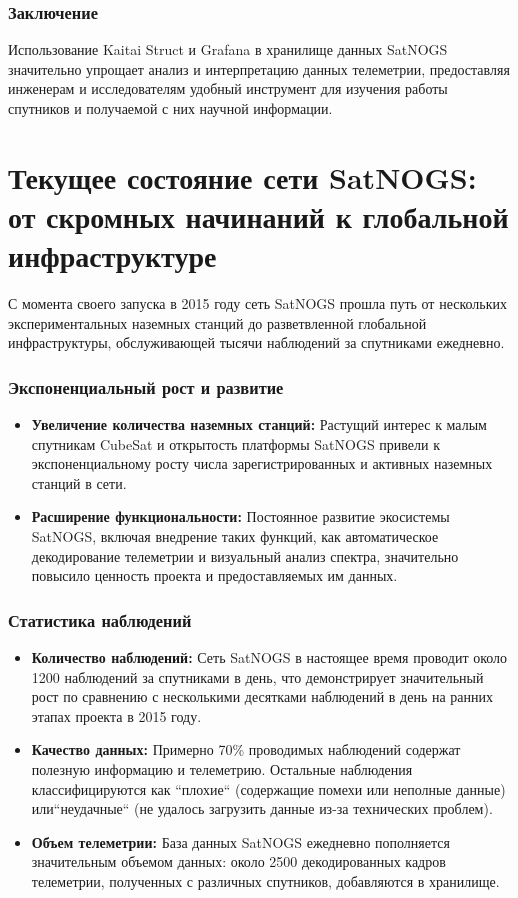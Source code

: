 \documentclass[14pt, a4paper]{../cls/coursework}
\begin{document}
    \subsubsection{Заключение}

    Использование Kaitai Struct и Grafana в хранилище данных SatNOGS значительно упрощает анализ и интерпретацию данных телеметрии, предоставляя инженерам и исследователям удобный инструмент для изучения работы спутников и получаемой с них научной информации.

    \section{Текущее состояние сети SatNOGS: от скромных начинаний к глобальной инфраструктуре}

    С момента своего запуска в 2015 году сеть SatNOGS прошла путь от нескольких экспериментальных наземных станций до разветвленной глобальной инфраструктуры, обслуживающей тысячи наблюдений за спутниками ежедневно.

    \subsubsection{Экспоненциальный рост и развитие}

    \begin{itemize}
        \item \textbf{Увеличение количества наземных станций:} Растущий интерес к малым спутникам CubeSat и открытость платформы SatNOGS привели к экспоненциальному росту числа зарегистрированных и активных наземных станций в сети.
        \item \textbf{Расширение функциональности:}  Постоянное развитие экосистемы SatNOGS, включая внедрение таких функций, как автоматическое декодирование телеметрии и визуальный анализ спектра,  значительно повысило ценность проекта и предоставляемых им данных.
    \end{itemize}

    \subsubsection{Статистика наблюдений}

    \begin{itemize}
        \item \textbf{Количество наблюдений:} Сеть SatNOGS в настоящее время проводит около 1200 наблюдений за спутниками в день, что демонстрирует значительный рост по сравнению с несколькими десятками наблюдений в день на ранних этапах проекта в 2015 году.
        \item \textbf{Качество данных:} Примерно 70\% проводимых наблюдений содержат полезную информацию и телеметрию.
        Остальные наблюдения классифицируются как ``плохие`` (содержащие помехи или неполные данные) или``неудачные`` (не удалось загрузить данные из-за технических проблем).
        \item \textbf{Объем телеметрии:}  База данных SatNOGS ежедневно пополняется значительным объемом данных: около 2500 декодированных кадров телеметрии, полученных с различных спутников,  добавляются в хранилище.
    \end{itemize}
\end{document}
